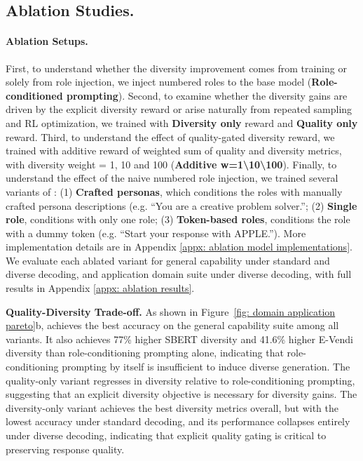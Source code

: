 


\subsection{Ablation Studies.}
% 

\paragraph{Ablation Setups.}
First, to understand whether the diversity improvement comes from training or solely from role injection, we inject numbered roles to the base model (\textbf{Role-conditioned prompting}). Second, to examine whether the diversity gains are driven by the explicit diversity reward or arise naturally from repeated sampling and RL optimization, we trained \method{} with \textbf{Diversity only} reward and \textbf{Quality only} reward. Third, to understand the effect of quality-gated diversity reward, we trained \method{} with additive reward of weighted sum of quality and diversity metrics, with diversity weight = 1, 10 and 100 (\textbf{Additive w=1\textbackslash10\textbackslash 100}). Finally, to understand the effect of the naive numbered role injection, we trained several variants of \method: (1) \textbf{Crafted personas}, which conditions the roles with manually crafted persona descriptions (e.g. ``You are a creative problem solver.''; (2) \textbf{Single role}, conditions with only one role; (3) \textbf{Token-based roles}, conditions the role with a dummy token (e.g. ``Start your response with APPLE.''). More implementation details are in Appendix \ref{appx: ablation model implementations}. We evaluate each ablated variant for general capability under standard and diverse decoding, and application domain suite under diverse decoding, with full results in Appendix \ref{appx: ablation results}.

\textbf{Quality-Diversity Trade-off.} As shown in Figure~\ref{fig: domain application pareto}b, \method{} achieves the best accuracy on the general capability suite among all variants. It also achieves 77\% higher SBERT diversity and 41.6\% higher E-Vendi diversity than role-conditioning prompting alone, indicating that role-conditioning prompting by itself is insufficient to induce diverse generation. The quality-only variant regresses in diversity relative to role-conditioning prompting, suggesting that an explicit diversity objective is necessary for diversity gains. The diversity-only variant achieves the best diversity metrics overall, but with the lowest accuracy under standard decoding, and its performance collapses entirely under diverse decoding, indicating that explicit quality gating is critical to preserving response quality.